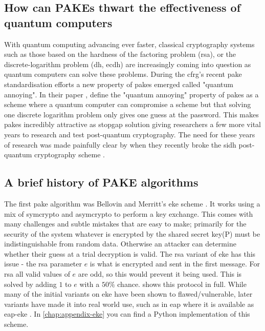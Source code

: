 \subsection{How can PAKEs thwart the effectiveness of quantum computers}
With quantum computing advancing ever faster, classical cryptography systems such as those based on the hardness of the factoring problem (\gls{rsa}), or the discrete-logarithm problem (\gls{dh}, \gls{ecdh}) are increasingly coming into question as quantum computers can solve these problems.
During the \gls{cfrg}'s recent \gls{pake} standardisation efforts a new property of \glspl{pake} emerged called "quantum annoying".
In their paper , \citeauthor{quantum-annoying} define the "quantum annoying" property of \glspl{pake} as a scheme where a quantum computer can compromise a scheme but that solving one discrete logarithm problem only gives one guess at the password.
This makes \glspl{pake} incredibly attractive as stopgap solution giving researchers a few more vital years to research and test post-quantum cryptography.
The need for these years of research was made painfully clear by \citeauthor{break-sidh} when they recently broke the \gls{sidh} post-quantum cryptography scheme \cite{break-sidh}.

\clearpage

\subsection{A brief history of PAKE algorithms}
The first \gls{pake} algorithm was Bellovin and Merritt's \gls{eke} scheme \cite{eke}.
It works using a mix of \gls{symcrypto} and \gls{asymcrypto} to perform a key exchange.
This comes with many challenges and subtle mistakes that are easy to make;
primarily for the security of the system whatever is encrypted by the shared secret key(P) must be indistinguishable from random data.
Otherwise an attacker can determine whether their guess at a trial decryption is valid.
The \gls{rsa} variant of \gls{eke} has this issue - the \gls{rsa} parameter $e$ is what is encrypted and sent in the first message.
For \gls{rsa} all valid values of $e$ are odd, so this would prevent it being used.
This is solved by adding $1$ to $e$ with a $50\%$ chance.
 shows this protocol in full. While many of the initial variants on \gls{eke} have been shown to flawed/vulnerable, later variants have made it into real world use, such as in \gls{eap} \cite{eap} where it is available as \gls{eap}-\gls{eke} \cite{eap-eke}.
In \cref{chap:appendix-eke} you can find a Python implementation of this scheme.

